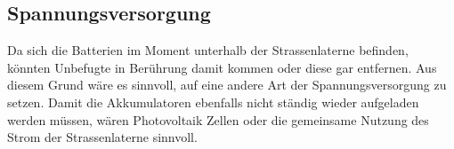 \subsection{Spannungsversorgung}
Da sich die Batterien im Moment unterhalb der Strassenlaterne befinden, könnten Unbefugte in Berührung damit kommen oder diese gar entfernen. Aus diesem Grund wäre es sinnvoll, auf eine andere Art der Spannungsversorgung zu setzen. Damit die Akkumulatoren ebenfalls nicht ständig wieder aufgeladen werden müssen, wären Photovoltaik Zellen oder die gemeinsame Nutzung des Strom der Strassenlaterne sinnvoll.